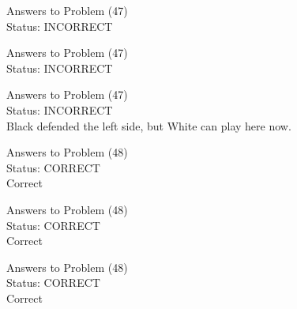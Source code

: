 \documentclass[11pt]{article}
\begin{document}
\begin{minipage}[t]{0.5\textwidth}
  {\centering
  
  Answers to Problem (47)\\
  Status: INCORRECT\\
  
  }
\end{minipage}
\begin{minipage}[t]{0.5\textwidth}
  {\centering
  
  Answers to Problem (47)\\
  Status: INCORRECT\\
  
  }
\end{minipage}
\begin{minipage}[t]{0.5\textwidth}
  {\centering
  
  Answers to Problem (47)\\
  Status: INCORRECT\\
  Black defended the left side, but White can play here now.\\
  }
\end{minipage}
\begin{minipage}[t]{0.5\textwidth}
  {\centering
  
  Answers to Problem (48)\\
  Status: CORRECT\\
  Correct\\
  }
\end{minipage}
\begin{minipage}[t]{0.5\textwidth}
  {\centering
  
  Answers to Problem (48)\\
  Status: CORRECT\\
  Correct\\
  }
\end{minipage}
\begin{minipage}[t]{0.5\textwidth}
  {\centering
  
  Answers to Problem (48)\\
  Status: CORRECT\\
  Correct\\
  }
\end{minipage}
\end{document}
